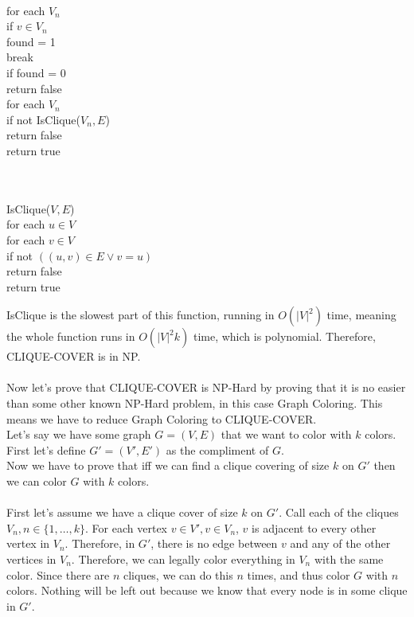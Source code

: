 \documentclass[11pt]{article}
\begin{document}
\begin{solution}
\begin{itemize}
\begin{algo}
                \\ for each $V_n$ \+
                \\ if $v \in V_n$ \+
                \\ found = 1
                \\ break \- \-
                \\ if found = 0 \+
                \\ return false \- \-
                \\ for each $V_n$ \+
                \\ if not IsClique($V_n, E$) \+
                \\ return false \- \- 
                \\ return true \-

                \\ \\ IsClique($V, E$)  \+
                \\ for each $u \in V$ \+
                \\ for each $v \in V$ \+
                \\ if not $((u, v) \in E \lor v = u)$ \+
                \\ return false \-\-\-
                \\ return true
            \end{algo}
            IsClique is the slowest part of this function, running in $O(|V|^2)$ time, meaning the whole function runs in $O(|V|^2k)$ time, which is polynomial. Therefore, CLIQUE-COVER is in NP.
            \\\\ Now let's prove that CLIQUE-COVER is NP-Hard by proving that it is no easier than some other known NP-Hard problem, in this case Graph Coloring. This means we have to reduce Graph Coloring to CLIQUE-COVER.
            \\ Let's say we have some graph $G = (V, E)$ that we want to color with $k$ colors. First let's define $G' = (V', E')$ as the compliment of $G$.
            \\ Now we have to prove that iff we can find a clique covering of size $k$ on $G'$ then we can color $G$ with $k$ colors.
            \\ \\ First let's assume we have a clique cover of size $k$ on $G'$. Call each of the cliques $V_n, n \in \{1,\ldots, k\}$. For each vertex $v \in V', v \in V_n$, $v$ is adjacent to every other vertex in $V_n$. Therefore, in $G'$, there is no edge between $v$ and any of the other vertices in $V_n$. Therefore, we can legally color everything in $V_n$ with the same color. Since there are $n$ cliques, we can do this $n$ times, and thus color $G$ with $n$ colors. Nothing will be left out because we know that every node is in some clique in $G'$.

\end{itemize}
\end{solution}
\end{document}

